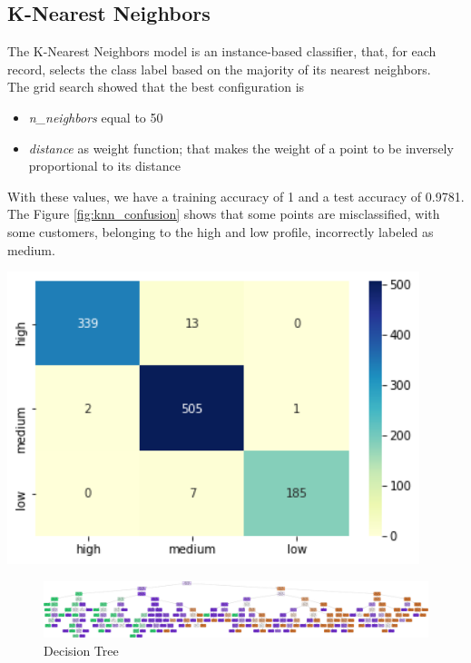 \subsection{K-Nearest Neighbors}
\begin{minipage}{0.59\textwidth}
The K-Nearest Neighbors model is an instance-based classifier, that, for each record, selects the class label based on the majority of its nearest neighbors.\\
The grid search showed that the best configuration is
\begin{itemize}
\item \emph{n\_neighbors} equal to 50
\item \emph{distance} as weight function; that makes the weight of a point to be inversely proportional to its distance
\end{itemize}

With these values, we have a training accuracy of 1 and a test accuracy of 0.9781.
The Figure \ref{fig:knn_confusion} shows that some points are misclassified, with some customers, belonging to the high and low profile, incorrectly labeled as medium.
\end{minipage}
\begin{minipage}{0.4\textwidth}
\centering
\includegraphics[width=0.90\textwidth]{img/knn_confusion.png}
\captionsetup{justification=centering}
\label{fig:knn_confusion}
\end{minipage}

\begin{figure}
\centering
\includegraphics[width=\linewidth]{img/decision_tree.png}
\caption{Decision Tree}
\label{fig:decision_tree}
\end{figure}

